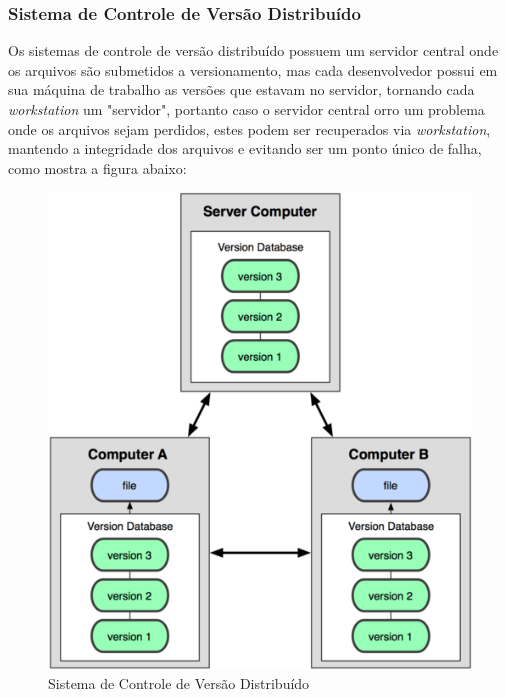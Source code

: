 \subsubsection{Sistema de Controle de Versão Distribuído}Os sistemas de controle de versão distribuído possuem um servidor central onde os arquivos são submetidos a versionamento, mas cada desenvolvedor possui em sua máquina de trabalho as versões que estavam no servidor, tornando cada \textit{workstation} um "servidor", portanto caso o servidor central orro um problema onde os arquivos sejam perdidos, estes podem ser recuperados via \textit{workstation}, mantendo a integridade dos arquivos e evitando ser um ponto único de falha, como mostra a figura abaixo:
\begin{figure}[tbh]
\centering
\includegraphics[width=0.7\linewidth]{./images/scvdist}
\caption[Sistema de Controle de Versão Distribuído]{Sistema de Controle de Versão Distribuído}
\label{fig:SCVDistribuido}
\end{figure}
